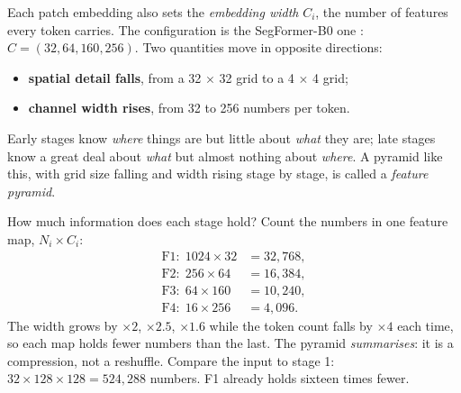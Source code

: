 Each patch embedding also sets the \emph{embedding width} $C_i$, the number of
features every token carries. The configuration is the SegFormer-B0 one \citep{xie2021segformer}:
$C = (32, 64, 160, 256)$. Two quantities move in opposite directions:
\begin{itemize}
\item \textbf{spatial detail falls}, from a 32 $\times$ 32 grid to a 4 $\times$ 4 grid;
\item \textbf{channel width rises}, from 32 to 256 numbers per token.
\end{itemize}
Early stages know \emph{where} things are but little about \emph{what} they are; late stages know a
great deal about \emph{what} but almost nothing about \emph{where}. A pyramid like this, with grid size
falling and width rising stage by stage, is called a \emph{feature pyramid}.

How much information does each stage hold? Count the numbers in one feature map, $N_i \times C_i$:
\begin{align*}
\text{F1}: \; 1024 \times 32 &= 32{,}768,\\
\text{F2}: \; 256 \times 64 &= 16{,}384,\\
\text{F3}: \; 64 \times 160 &= 10{,}240,\\
\text{F4}: \; 16 \times 256 &= 4{,}096.
\end{align*}
The width grows by $\times 2$, $\times 2.5$, $\times 1.6$ while the token count falls by $\times 4$
each time, so each map holds fewer numbers than the last. The pyramid \emph{summarises}: it is a
compression, not a reshuffle. Compare the input to stage 1: $32 \times 128 \times 128 = 524{,}288$
numbers. F1 already holds sixteen times fewer.


